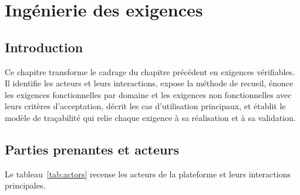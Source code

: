 %
\chapter{Ingénierie des exigences}
\label{chap:requirements}

\section{Introduction}
\label{sec:req_intro}

Ce chapitre transforme le cadrage du chapitre précédent en exigences
vérifiables. Il identifie les acteurs et leurs interactions, expose la méthode
de recueil, énonce les exigences fonctionnelles par domaine et les exigences
non fonctionnelles avec leurs critères d'acceptation, décrit les cas
d'utilisation principaux, et établit le modèle de traçabilité qui relie chaque
exigence à sa réalisation et à sa validation.

\section{Parties prenantes et acteurs}
\label{sec:actors}

Le tableau~\ref{tab:actors} recense les acteurs de la plateforme et leurs
interactions principales.

